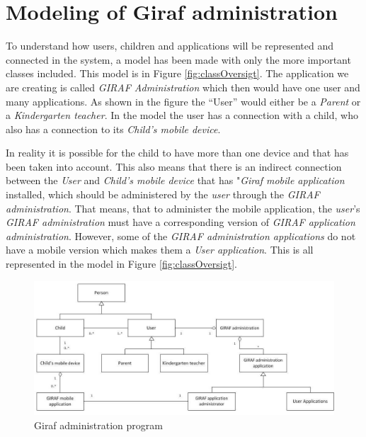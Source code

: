 \section{Modeling of Giraf administration}
To understand how users, children and applications will be represented and connected in the system, a model  has been made with only the more important classes included. This model is in Figure \vref{fig:classOversigt}. The application we are creating is called \emph{GIRAF Administration} which then would have one user and many applications. As shown in the figure the ``User'' would either be a \emph{Parent} or a \emph{Kindergarten teacher}. In the model the user has a connection with a child, who also has a connection to its \emph{Child's mobile device}.

In reality it is possible for the child to have more than one device and that has been taken into account. This also means that there is an indirect connection between the \emph{User} and \emph{Child's mobile device} that has "\emph{Giraf mobile application} installed, which should be administered by the \emph{user} through the \emph{GIRAF administration}. That means, that to administer the mobile application, the \emph{user}'s \emph{GIRAF administration} must have a corresponding version of \emph{GIRAF application administration}. However, some of the \emph{GIRAF administration applications} do not have a mobile version which makes them a \emph{User application}. This is all represented in the model in Figure \vref{fig:classOversigt}.


\begin{figure}[!ht]
	\centering
		\includegraphics[width=1.00\textwidth]{img/classOversigt.jpg}
	\caption{Giraf administration program}
	\label{fig:classOversigt}
\end{figure}
\newpage